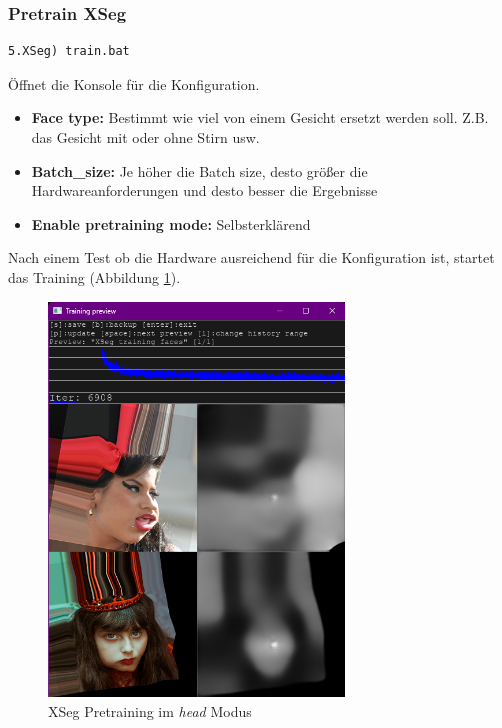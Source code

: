 \subsubsection{Pretrain XSeg}
\begin{lstlisting}[label={lst:xseg-pretraining},numbers=none]
    5.XSeg) train.bat
\end{lstlisting}
Öffnet die Konsole für die Konfiguration.
\begin{itemize}
    \item \textbf{Face type:} Bestimmt wie viel von einem Gesicht ersetzt werden soll. Z.B. das Gesicht mit oder ohne Stirn usw.
    \item \textbf{Batch\_size:} Je höher die Batch size, desto größer die Hardwareanforderungen und desto besser die Ergebnisse
    \item \textbf{Enable pretraining mode:} Selbsterklärend
\end{itemize}
Nach einem Test ob die Hardware ausreichend für die Konfiguration ist, startet das Training (Abbildung \ref{fig:xseg-pretrain}).
\begin{figure}
    \center
    \includegraphics[width=0.7\textwidth]{Bilder/DFL/XSegEditor-3-pretrain}
    \caption{XSeg Pretraining im \textit{head} Modus}
    \label{fig:xseg-pretrain}
\end{figure}

